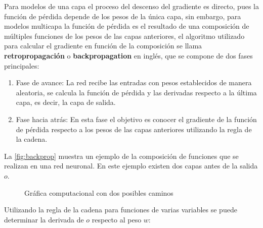 Para modelos de una capa el proceso del descenso del gradiente es directo, pues la función de pérdida depende de los pesos de la
única capa, sin embargo, para modelos multicapa la función de pérdida es el resultado de una composición de múltiples funciones de los pesos de las capas anteriores, el algoritmo utilizado para calcular el gradiente en función de la composición se llama \textbf{retropropagación} o \textbf{backpropagation} en inglés, que se compone de dos fases principales:
\begin{enumerate}
\item Fase de avance: La red recibe las entradas con pesos establecidos de manera aleatoria, se calcula la función de pérdida y las derivadas respecto a la última capa, es decir, la capa de salida.
  \item Fase hacia atrás: En esta fase el objetivo es conocer el gradiente de la función de pérdida respecto a los pesos de las capas anteriores utilizando la regla de la cadena.
\end{enumerate}

La \autoref{fig:backprop} muestra un ejemplo de la composición de funciones que se realizan en una red neuronal. En este ejemplo existen dos capas antes de la salida $o$.

\begin{figure}[h]
  \centering
\caption{Gráfica computacional con dos posibles caminos \cite{Nielsen:2018}}
\label{fig:backprop}
\end{figure}

Utilizando la regla de la cadena para funciones de varias variables se puede determinar la derivada de $o$ respecto al peso $w$:


